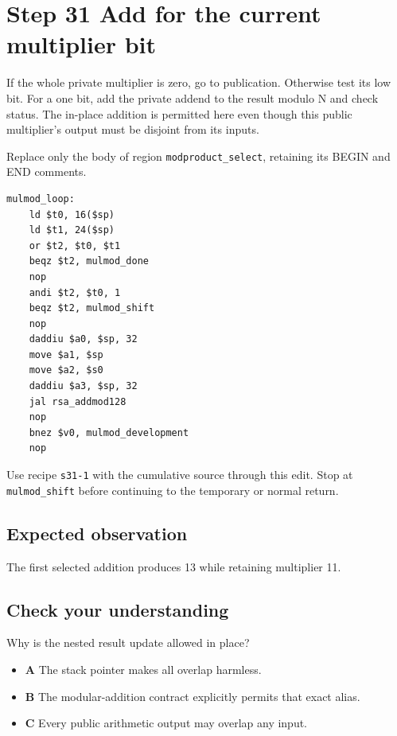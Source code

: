 \section{Step 31 Add for the current multiplier bit}\label{rsa-s31}

If the whole private multiplier is zero, go to publication. Otherwise test its low bit. For a one bit, add the private addend to the result modulo N and check status. The in-place addition is permitted here even though this public multiplier's output must be disjoint from its inputs.

Replace only the body of region \texttt{modproduct\_select}, retaining its BEGIN and END comments.

\begin{verbatim}
mulmod_loop:
    ld $t0, 16($sp)
    ld $t1, 24($sp)
    or $t2, $t0, $t1
    beqz $t2, mulmod_done
    nop
    andi $t2, $t0, 1
    beqz $t2, mulmod_shift
    nop
    daddiu $a0, $sp, 32
    move $a1, $sp
    move $a2, $s0
    daddiu $a3, $sp, 32
    jal rsa_addmod128
    nop
    bnez $v0, mulmod_development
    nop
\end{verbatim}

Use recipe \texttt{s31-1} with the cumulative source through this edit. Stop at \texttt{mulmod\_shift} before continuing to the temporary or normal return.

\subsection{Expected observation}
The first selected addition produces 13 while retaining multiplier 11.

\subsection{Check your understanding}
Why is the nested result update allowed in place?

\begin{itemize}
\item \textbf{A} The stack pointer makes all overlap harmless.
\item \textbf{B} The modular-addition contract explicitly permits that exact alias.
\item \textbf{C} Every public arithmetic output may overlap any input.
\end{itemize}
